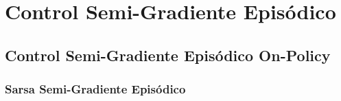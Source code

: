 \documentclass[10pt, envcountsect, handout, aspectratio=1610, hyperref={hypertexnames=true}]{beamer}
\begin{document}
\section{Control Semi-Gradiente Episódico}


\subsection{Control Semi-Gradiente Episódico On-Policy}

\subsubsection{Sarsa Semi-Gradiente Episódico}
\end{document}
